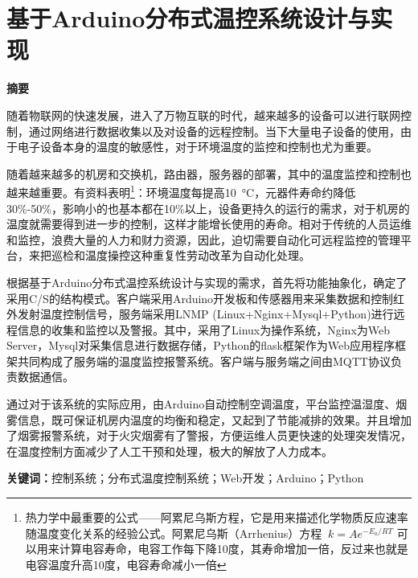 \thispagestyle{abstractStyle} 

\section*{ \centering 基于Arduino分布式温控系统设计与实现}

\begin{center}
	\textbf{ 摘\hspace{1em}要}
\end{center}
\vspace{2em}

随着物联网的快速发展，进入了万物互联的时代，越来越多的设备可以进行联网控制，通过网络进行数据收集以及对设备的远程控制。当下大量电子设备的使用，由于电子设备本身的温度的敏感性，对于环境温度的监控和控制也尤为重要。

随着越来越多的机房和交换机，路由器，服务器的部署，其中的温度监控和控制也越来越重要。有资料表明\footnote{热力学中最重要的公式——阿累尼乌斯方程，它是用来描述化学物质反应速率随温度变化关系的经验公式。阿累尼乌斯（Arrhenius）方程 $\ k=Ae^{{{-E_{a}}/{RT}}}$ 可以用来计算电容寿命，电容工作每下降10度，其寿命增加一倍，反过来也就是电容温度升高10度，电容寿命减小一倍}：环境温度每提高\SI{10}{\degreeCelsius}，元器件寿命约降低30\%-50\%，影响小的也基本都在10\%以上，设备更持久的运行的需求，对于机房的温度就需要得到进一步的控制，这样才能增长使用的寿命。相对于传统的人员运维和监控，浪费大量的人力和财力资源，因此，迫切需要自动化可远程监控的管理平台，来把巡检和温度操控这种重复性劳动改革为自动化处理。

根据基于Arduino分布式温控系统设计与实现的需求，首先将功能抽象化，确定了采用C/S的结构模式。客户端采用Arduino开发板和传感器用来采集数据和控制红外发射温度控制信号，服务端采用LNMP (Linux+Nginx+Mysql+Python)进行远程信息的收集和监控以及警报。其中，采用了Linux为操作系统，Nginx为Web Server，Mysql对采集信息进行数据存储，Python的flask框架作为Web应用程序框架共同构成了服务端的温度监控报警系统。客户端与服务端之间由MQTT协议负责数据通信。

通过对于该系统的实际应用，由Arduino自动控制空调温度，平台监控温湿度、烟雾信息，既可保证机房内温度的均衡和稳定，又起到了节能减排的效果。并且增加了烟雾报警系统，对于火灾烟雾有了警报，方便运维人员更快速的处理突发情况，在温度控制方面减少了人工干预和处理，极大的解放了人力成本。


\vspace{1em}
\noindent
\textbf{关键词：}控制系统；分布式温度控制系统；Web开发；Arduino；Python


